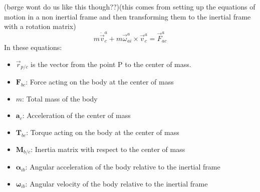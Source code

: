 (børge wont do us like this though??)(this comes from setting up the equations of motion in a non inertial frame and then transforming them to the inertial frame with a rotation matrix)
\begin{equation}
    m \dot{\vec{v}}_c^a + m \vec{\omega}_{ai}^a \times \vec{v}_c^a = \vec{F}_{ac}^{a}
\end{equation}
In these equations:
\begin{itemize}
    \item $\vec{r}_{p/c}$ is the vector from the point P to the center of mass.
    \item $\mathbf{F}_{bc}$: Force acting on the body at the center of mass
    \item $m$: Total mass of the body
    \item $\mathbf{a}_c$: Acceleration of the center of mass
    \item $\mathbf{T}_{bc}$: Torque acting on the body at the center of mass
    \item $\mathbf{M}_{b/c}$: Inertia matrix with respect to the center of mass
    \item $\boldsymbol{\alpha}_{ib}$: Angular acceleration of the body relative to the inertial frame
    \item $\boldsymbol{\omega}_{ib}$: Angular velocity of the body relative to the inertial frame
\end{itemize}